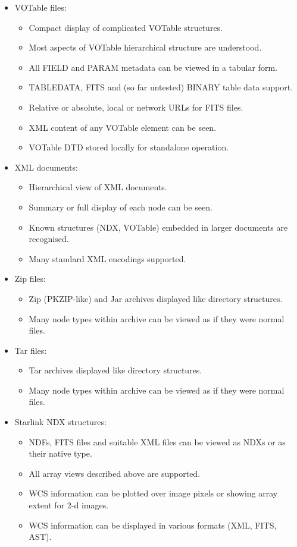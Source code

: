 \documentclass[twoside,11pt]{article}
\renewcommand{\_}{\texttt{\symbol{95}}}
\begin{document}
\begin{itemize}
\begin{itemize}
\item VOTable files:
\begin{itemize}
 \item Compact display of complicated VOTable structures.
 \item Most aspects of VOTable hierarchical structure are understood.
 \item All FIELD and PARAM metadata can be viewed in a tabular form.
 \item TABLEDATA, FITS and (so far untested) BINARY table data support.
 \item Relative or absolute, local or network URLs for FITS files.
 \item XML content of any VOTable element can be seen.
 \item VOTable DTD stored locally for standalone operation. 
\end{itemize}

\item XML documents:
\begin{itemize}
 \item Hierarchical view of XML documents.
 \item Summary or full display of each node can be seen.
 \item Known structures (NDX, VOTable) embedded in larger documents are
       recognised.
 \item Many standard XML encodings supported. 
\end{itemize}

\item Zip files:
\begin{itemize}
 \item Zip (PKZIP-like) and Jar archives displayed like directory structures.
 \item Many node types within archive can be viewed as if they were normal
       files. 
\end{itemize}

\item Tar files:
\begin{itemize}
 \item Tar archives displayed like directory structures.
 \item Many node types within archive can be viewed as if they were normal
       files. 
\end{itemize}

\item Starlink NDX structures:
\begin{itemize}
 \item NDFs, FITS files and suitable XML files can be viewed as NDXs or as
       their native type.
 \item All array views described above are supported.
 \item WCS information can be plotted over image pixels or showing array extent
       for 2-d images.
 \item WCS information can be displayed in various formats (XML, FITS, AST). 
\end{itemize}


\end{itemize}
\end{itemize}
\end{document}
